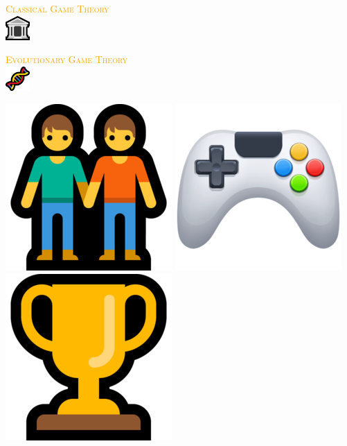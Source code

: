 \documentclass{beamer}
\begin{document}
\begin{frame}
    \begin{center}
    \Large
    \textcolor{orange}{\textsc{Classical Game Theory}} \\ \vspace{3pt}
    \includegraphics[width=0.07\textwidth]{static/Classical.png} \\ \vspace{20pt}

    \textcolor{orange}{\textsc{Evolutionary Game Theory}} \\ \vspace{3pt}
    \includegraphics[width=0.07\textwidth]{static/evolution.png}
    \end{center}
\end{frame}

\begin{frame}
    \centering
    \includegraphics[width=.2\textwidth]{static/players} \hspace{.6cm}
    \includegraphics[width=.2\textwidth]{static/actions} \hspace{.6cm}
    \includegraphics[width=.2\textwidth]{static/objective}
\end{frame}

\begin{frame}
    \begin{center}
    
    \end{center}
\end{frame}
\end{document}
